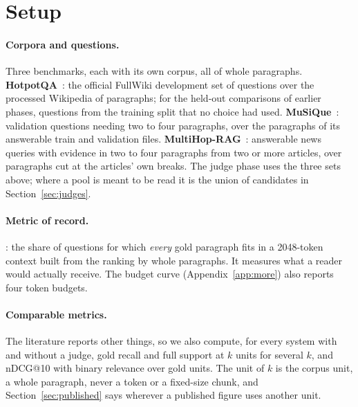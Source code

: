 \section{Setup}
\label{sec:setup}

\paragraph{Corpora and questions.} Three benchmarks, each with its own corpus, all of whole
paragraphs. \textbf{HotpotQA}~\citep{yang2018hotpotqa}: the official FullWiki development
set of \nQuestionsHotpot{} questions over the processed Wikipedia of \hopCostNineUnits{} paragraphs;
for the held-out comparisons of earlier phases, questions from the training split that no
choice had used. \textbf{MuSiQue}~\citep{trivedi2022musique}: \nQuestionsMusique{} validation
questions needing two to four paragraphs, over the \hopCostFifteenUnits{} paragraphs of its answerable
train and validation files. \textbf{MultiHop-RAG}~\citep{tang2024multihoprag}: \nQuestionsMultihop{}
answerable news queries with evidence in two to four paragraphs from two or more articles,
over \hopCostSixteenUnits{} paragraphs cut at the articles' own breaks. The judge phase uses the
three sets above; where a pool is meant to be read it is the union of candidates in
Section~\ref{sec:judges}.

\paragraph{Metric of record.} \FS: the share of questions for which \emph{every} gold paragraph
fits in a 2048-token context built from the ranking by whole paragraphs. It measures what a
reader would actually receive. The budget curve (Appendix~\ref{app:more}) also reports four token
budgets.

\paragraph{Comparable metrics.} The literature reports other things, so we also compute, for
every system with and without a judge, gold recall and full support at $k$ units for several
$k$, and nDCG@10 with binary relevance over gold units. The unit of $k$ is the corpus unit,
a whole paragraph, never a token or a fixed-size chunk, and Section~\ref{sec:published} says
wherever a published figure uses another unit.

